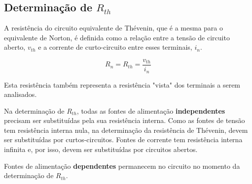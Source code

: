 \documentclass[12pt,fleqn]{book} %
\begin{document}
    \subsection{Determinação de $R_{th}$}

A resistência do circuito equivalente de Thévenin, que é a mesma para o equivalente de Norton, é definida como a relação entre a tensão de circuito aberto, $v_{th}$ e a corrente de curto-circuito entre esses terminais, $i_n$.

\begin{equation}\label{rth}
R_n = R_{th} = \frac{v_{th}}{i_n}
\end{equation}

Esta resistência também representa a resistência "vista" dos terminais a serem analisados.

\begin{remark}
Na determinação de $R_{th}$, todas as fontes de alimentação \textbf{independentes} precisam ser substituídas pela sua resistência interna. Como as fontes de tensão tem resistência interna nula, na determinação da resistência de Thévenin, devem ser substituídas por curtos-circuitos. Fontes de corrente tem resistência interna infinita e, por isso, devem ser substituídas por circuitos abertos.
\end{remark}

\begin{remark}
Fontes de alimentação \textbf{dependentes} permanecem no circuito no momento da determinação de $R_{th}$.
\end{remark}
\end{document}
